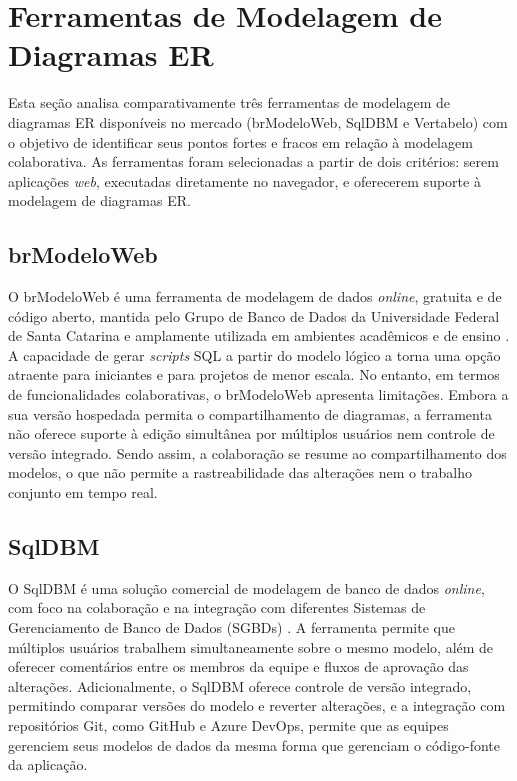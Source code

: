 \section[Ferramentas de Modelagem de Diagramas ER]{Ferramentas de Modelagem de Diagramas ER}

Esta seção analisa comparativamente três ferramentas de modelagem de diagramas ER disponíveis no mercado (brModeloWeb, SqlDBM e Vertabelo) com o objetivo de identificar seus pontos fortes e fracos em relação à modelagem colaborativa. As ferramentas foram selecionadas a partir de dois critérios: serem aplicações \textit{web}, executadas diretamente no navegador, e oferecerem suporte à modelagem de diagramas ER.

\subsection[brModeloWeb]{brModeloWeb}

O brModeloWeb é uma ferramenta de modelagem de dados \textit{online}, gratuita e de código aberto, mantida pelo Grupo de Banco de Dados da Universidade Federal de Santa Catarina e amplamente utilizada em ambientes acadêmicos e de ensino \cite{BrModeloWeb2026,SouzaNeto2026}. A capacidade de gerar \textit{scripts} SQL a partir do modelo lógico a torna uma opção atraente para iniciantes e para projetos de menor escala. No entanto, em termos de funcionalidades colaborativas, o brModeloWeb apresenta limitações. Embora a sua versão hospedada permita o compartilhamento de diagramas, a ferramenta não oferece suporte à edição simultânea por múltiplos usuários nem controle de versão integrado. Sendo assim, a colaboração se resume ao compartilhamento dos modelos, o que não permite a rastreabilidade das alterações nem o trabalho conjunto em tempo real.

\subsection[SqlDBM]{SqlDBM}

O SqlDBM é uma solução comercial de modelagem de banco de dados \textit{online}, com foco na colaboração e na integração com diferentes Sistemas de Gerenciamento de Banco de Dados (SGBDs) \cite{SqlDBM2026}. A ferramenta permite que múltiplos usuários trabalhem simultaneamente sobre o mesmo modelo, além de oferecer comentários entre os membros da equipe e fluxos de aprovação das alterações. Adicionalmente, o SqlDBM oferece controle de versão integrado, permitindo comparar versões do modelo e reverter alterações, e a integração com repositórios Git, como GitHub e Azure DevOps, permite que as equipes gerenciem seus modelos de dados da mesma forma que gerenciam o código-fonte da aplicação.

